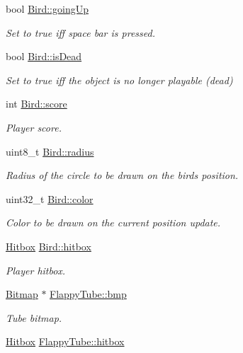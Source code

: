 \begin{DoxyCompactItemize}
bool \mbox{\hyperlink{group__flappy_ga4bdcadd04d95df1a76b650b03e103522}{Bird\+::going\+Up}}
\begin{DoxyCompactList}\small\item\em Set to true iff space bar is pressed. \end{DoxyCompactList}\item 
bool \mbox{\hyperlink{group__flappy_gaf4f24b08e29e948d98b6014bb745c395}{Bird\+::is\+Dead}}
\begin{DoxyCompactList}\small\item\em Set to true iff the object is no longer playable (dead) \end{DoxyCompactList}\item 
int \mbox{\hyperlink{group__flappy_ga09a00f6fd91f17cf0d2b1b301c6a9da7}{Bird\+::score}}
\begin{DoxyCompactList}\small\item\em Player score. \end{DoxyCompactList}\item 
uint8\+\_\+t \mbox{\hyperlink{group__flappy_ga01e57038bda03482df87afc78bc2e0e1}{Bird\+::radius}}
\begin{DoxyCompactList}\small\item\em Radius of the circle to be drawn on the bird\textquotesingle{}s position. \end{DoxyCompactList}\item 
uint32\+\_\+t \mbox{\hyperlink{group__flappy_ga99a3ab5ac95874c8563f8c24aa79ae54}{Bird\+::color}}
\begin{DoxyCompactList}\small\item\em Color to be drawn on the current position update. \end{DoxyCompactList}\item 
\mbox{\hyperlink{struct_hitbox}{Hitbox}} \mbox{\hyperlink{group__flappy_ga22c913a0e2c2eb7faceaf256ffc2a21f}{Bird\+::hitbox}}
\begin{DoxyCompactList}\small\item\em Player hitbox. \end{DoxyCompactList}\item 
\mbox{\hyperlink{struct_bitmap}{Bitmap}} $\ast$ \mbox{\hyperlink{group__flappy_ga7baae1562a0fdd78f0fdf9bc095d11b7}{Flappy\+Tube\+::bmp}}
\begin{DoxyCompactList}\small\item\em Tube bitmap. \end{DoxyCompactList}\item 
\mbox{\hyperlink{struct_hitbox}{Hitbox}} \mbox{\hyperlink{group__flappy_ga6c57c0cbff50d942c40410631ae3eba2}{Flappy\+Tube\+::hitbox}}

\end{DoxyCompactItemize}

